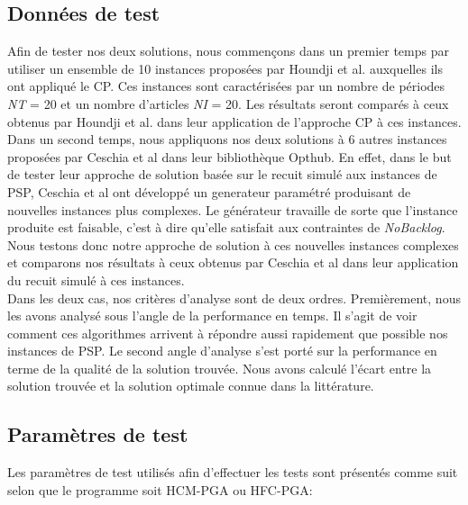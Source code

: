 \documentclass[12pt,a4paper]{article}
\begin{document}
		\subsection{Données de test}
		
		Afin de tester nos deux solutions, nous commençons dans un premier temps par utiliser un ensemble de 10 instances proposées par Houndji et al. auxquelles ils ont appliqué le CP. Ces instances sont caractérisées par un nombre de périodes \emph{NT} = 20 et un nombre d'articles \emph{NI} = 20. Les résultats seront comparés à ceux obtenus par Houndji et al. dans leur application de l'approche CP à ces instances. \\
		\hspace*{.5cm} Dans un second temps, nous appliquons nos deux solutions à 6 autres instances proposées par Ceschia et al \cite{ceschia} dans leur bibliothèque Opthub. En effet, dans le but de tester leur approche de solution basée sur le recuit simulé aux instances de PSP, Ceschia et al ont  développé un generateur paramétré produisant de nouvelles instances plus complexes. Le générateur travaille de sorte que l'instance produite est faisable, c'est à dire qu'elle satisfait aux contraintes de \emph{NoBacklog}. Nous testons donc notre approche de solution à ces nouvelles instances complexes et comparons nos résultats à ceux obtenus par Ceschia et al dans leur application du recuit simulé à ces instances. \\
		\hspace*{.5cm} Dans les deux cas, nos critères d'analyse sont de deux ordres. Premièrement, nous les avons analysé sous l'angle de la performance en temps. Il s'agit de voir comment ces algorithmes arrivent à répondre aussi rapidement que possible nos instances de PSP.  Le second angle d'analyse s'est porté sur la performance en terme de la qualité de la solution trouvée. Nous avons calculé l'écart entre la solution trouvée et la solution optimale connue dans la littérature.
		
		\subsection{Paramètres de test}
		Les paramètres de test utilisés afin d'effectuer les tests sont présentés comme suit selon que le programme soit HCM-PGA ou HFC-PGA:
\end{document}
